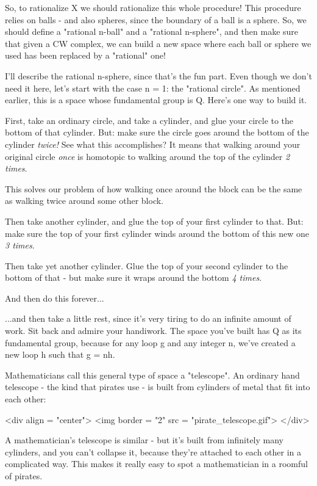 So, to rationalize X we should rationalize this whole procedure!  This
procedure relies on balls - and also spheres, since the boundary of a
ball is a sphere.  So, we should define a "rational n-ball"
and a "rational n-sphere", and then make sure that given a
CW complex, we can build a new space where each ball or sphere we used
has been replaced by a "rational" one!

I'll describe the rational n-sphere, since that's the fun part.
Even though we don't need it here, let's start with the case n = 1:
the "rational circle".  As mentioned earlier, this is a space whose 
fundamental group is Q.  Here's one way to build it.  

First, take an ordinary circle, and take a cylinder, and glue your
circle to the bottom of that cylinder.  But: make sure the 
circle goes around the bottom of the cylinder \emph{twice!} See what
this accomplishes?  It means that walking around your original circle
\emph{once} is homotopic to walking around the top of the cylinder
\emph{2 times}.

This solves our problem of how walking once around the block can be
the same as walking twice around some other block.

Then take another cylinder, and glue the top of your first cylinder 
to that.  But: make sure the top of your first cylinder winds around 
the bottom of this new one \emph{3 times}.  

Then take yet another cylinder.   Glue the top of your second
cylinder to the bottom of that - but make sure it wraps around
the bottom \emph{4 times}.  

And then do this forever... 

...and then take a little rest, since it's
very tiring to do an infinite amount of work.  Sit back and admire
your handiwork.  
The space you've built has Q as its fundamental
group, because for any loop g and any integer n, we've created a new
loop h such that g = nh.

Mathematicians call this general type of space a "telescope".
An ordinary hand telescope - the kind that pirates use - is built 
from cylinders of metal that fit into each other:

<div align = "center">
<img border = "2" src = "pirate_telescope.gif">
</div>

A mathematician's telescope is similar - but it's built from infinitely
many cylinders, and you can't collapse it, because they're attached to
each other in a complicated way.  This makes it really easy to spot a
mathematician in a roomful of pirates.

